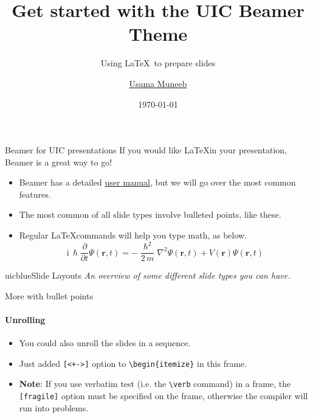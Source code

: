 \documentclass{beamer}
\title{Get started with the UIC Beamer Theme}
\subtitle{Using \LaTeX\ to prepare slides}
\author{\href{mailto:umunee2@uic.edu}{Usama Muneeb}}
\date{\today}
\newcommand{\hrefcol}[2]{\textcolor{uihteal}{\href{#1}{#2}}}
\begin{document}
\maketitle
{} %



\begin{frame}{Beamer for UIC presentations}
If you would like \LaTeX in your presentation, Beamer is a great way to go!
\begin{itemize}
\item Beamer has a detailed
\hrefcol{https://www.ctan.org/tex-archive/macros/latex/contrib/beamer/doc/beameruserguide.pdf}{user
 manual}, but we will go over the most common features.
\item The most common of all slide types involve bulleted points, like these.
\item Regular \LaTeX commands will help you type math, as below.
\begin{equation*}
\mathrm{i}\,\hslash\frac{\partial}{\partial t} \Psi(\mathbf{r},t) = -\frac{\hslash^2}{2\,m}\nabla^2\Psi(\mathbf{r},t) + V(\mathbf{r})\Psi(\mathbf{r},t)
\end{equation*}
\end{itemize}
\end{frame}


\begin{chapter}{uicblue}{Slide Layouts}
\textit{An overview of some different slide types you can have.}
\end{chapter}


\begin{frame}[fragile]{More with bullet points}
\framesubtitle{Unrolling}
\begin{itemize}[<+->]
\item You could also unroll the slides in a sequence.
\item Just added \verb|[<+->]| option to \verb|\begin{itemize}| in this frame.
\item \textbf{Note}: If you use verbatim test (i.e. the \verb|\verb| command) in a frame, the \verb|[fragile]| option must be specified on the frame, otherwise the compiler will run into problems.
\end{itemize}
\end{frame}
\end{document}
